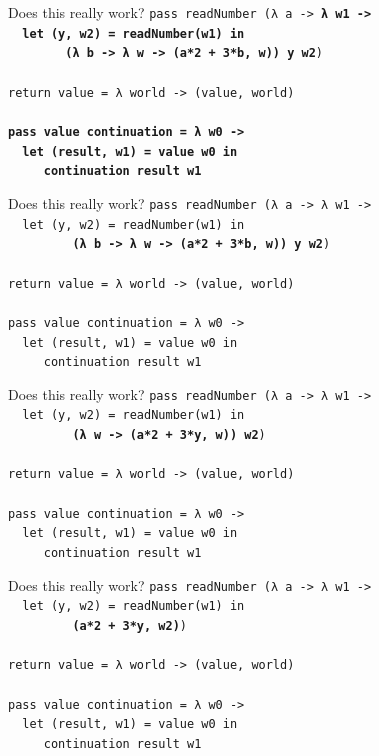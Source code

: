 \documentclass{beamer}
\begin{document}
\begin{frame}{Does this really work?}
  \texttt{pass readNumber (λ a -> \textbf{λ w1 -> \\
      \ \ let (y, w2) = readNumber(w1) in\\
      \ \ \ \ \ \ \ \ (λ b -> λ w -> (a*2 + 3*b, w)) y w2})\\
    \ \\
    return value = λ world -> (value, world) \\
    \ \\
    \textbf{pass value continuation = λ w0 -> \\
      \ \ let (result, w1) = value w0 in \\
      \ \ \ \ \ continuation result w1}
  }
\end{frame}

\begin{frame}{Does this really work?}
  \texttt{pass readNumber (λ a -> λ w1 -> \\
    \ \ let (y, w2) = readNumber(w1) in\\
    \ \ \ \ \ \ \ \ \ \textbf{(λ b -> λ w -> (a*2 + 3*b, w)) y w2})\\
    \ \\
    return value = λ world -> (value, world) \\
    \ \\
    pass value continuation = λ w0 -> \\
    \ \ let (result, w1) = value w0 in \\
    \ \ \ \ \ continuation result w1
  }
\end{frame}

\begin{frame}{Does this really work?}
  \texttt{pass readNumber (λ a -> λ w1 -> \\
    \ \ let (y, w2) = readNumber(w1) in\\
    \ \ \ \ \ \ \ \ \ \textbf{(λ w -> (a*2 + 3*y, w)) w2})\\
    \ \\
    return value = λ world -> (value, world) \\
    \ \\
    pass value continuation = λ w0 -> \\
    \ \ let (result, w1) = value w0 in \\
    \ \ \ \ \ continuation result w1
  }
\end{frame}

\begin{frame}{Does this really work?}
  \texttt{pass readNumber (λ a -> λ w1 -> \\
    \ \ let (y, w2) = readNumber(w1) in\\
    \ \ \ \ \ \ \ \ \ \textbf{(a*2 + 3*y, w2)})\\
    \ \\
    return value = λ world -> (value, world) \\
    \ \\
    pass value continuation = λ w0 -> \\
    \ \ let (result, w1) = value w0 in \\
    \ \ \ \ \ continuation result w1
  }
\end{frame}
\end{document}
